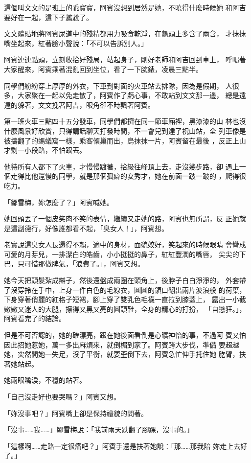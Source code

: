 這個叫文文的是班上的乖寶寶，阿賓沒想到居然是她，不曉得什麼時候她
和阿吉要好在一起，這下子尷尬了。

文文體貼地將阿賓尿道中的殘精都用力吸食乾淨，在龜頭上多含了兩含，
才抹抹嘴坐起來，紅著臉小聲說：「不可以告訴別人。」

阿賓連連點頭，立刻收拾好殘局，站起身子，剛好老師和阿吉回到車上，
呼喝著大家醒來，阿賓乘著混亂回到坐位，看了一下腕錶，凌晨三點半。

同學們紛紛穿上厚厚的外衣，下車到對面的火車站去排隊，因為是假期，
人很多，大家聚在一起以免走散了，阿賓作了虧心事，不敢站到文文那一邊，
總是遠遠的躲著，文文挽著阿吉，眼角卻不時飄著阿賓。

第一班火車三點四十五分發車，同學們都擠在同一節車廂裡，黑漆漆的山
林也沒什麼風景好欣賞，只得講話聊天打發時間，不一會兒到達了祝山站，全
列車像是被擣翻了的螞蟻窩一樣，乘客傾巢而出，烏抹抹一片，阿賓留在最後
，反正上山才剩一小段路，不怕跟丟。

他待所有人都下了火車，才慢慢踱著，拾級往峰頂上去，走沒幾步路，卻
遇上一個走得比他還慢的同學，就是那個孤癖的女秀才，她在前面一跛一跛的
，爬得很吃力。

「鄒雪梅，妳怎麼了？」阿賓喊她。

她回頭丟了一個皮笑肉不笑的表情，繼續又走她的路，阿賓也無所謂，反
正她就是這副德行，好像誰都看不起，「臭女人！」，阿賓想。

老實說這臭女人長還得不賴，適中的身材，面貌姣好，笑起來的時候眼睛
會彎成可愛的月芽兒，一排潔白的皓齒，小小挺挺的鼻子，紅紅豐潤的嘴唇，
尖尖的下巴，只可惜那傲脾氣，「浪費了。」，阿賓又想。

她今天把頭髮紮成辮子，然後還盤成兩圈在頭角上，後脖子白白淨淨的，
外套帶了沒穿拎在手中，上身一件白色的毛線衣，圓圓的領口翻出兩片波浪般
的荷葉，下身穿著俏麗的紅格子短裙，腳上穿了雙乳色毛襪一直拉到膝蓋上，
露出一小截嫩嫩又迷人的大腿，擦得又黑又亮的圓頭鞋，全身的精心的打扮，
「自戀狂。」，阿賓看完了的結論。

但是不可否認的，她的確漂亮，跟在她後面看倒是心曠神怡的事，不過阿
賓又怕因此招她惹她，萬一多出麻煩來，就倒楣到家了。阿賓跨大步伐，準備
要超越她，突然間她一失足，沒了平衡，就要歪倒下去，阿賓急忙伸手托住她
肐臂，扶著她站起。

她兩眼噙淚，不穩的站著。

「自己沒走好也要哭嗎？」阿賓又想。

「妳沒事吧？」阿賓嘴上卻是保持禮貌的問著。

「沒事……我……」鄒雪梅說：「我前兩天跌翻了腳踝，沒事的。」

「這樣啊……走路一定很痛吧？」阿賓手還是扶著她說：「那……那我陪
妳走上去好了。」

